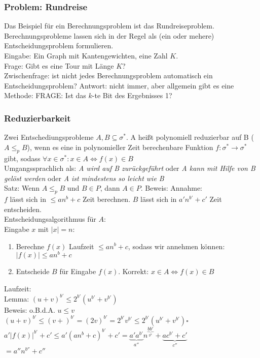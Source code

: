 \subsubsection{Problem: Rundreise}
Das Beispiel für ein Berechnungsproblem ist das Rundreiseproblem. Berechnungsprobleme lassen sich in der Regel als (ein oder mehere) Entscheidungsproblem formulieren.\\
Eingabe: Ein Graph mit Kantengewichten, eine Zahl $K$.\\
Frage: Gibt es eine Tour mit Länge $K$?\\
Zwischenfrage: ist nicht jedes Berechnungsproblem automatisch ein Entscheidungsproblem? Antwort: nicht immer, aber allgemein gibt es eine Methode:
FRAGE: Ist das $k$-te Bit des Ergebnisses 1?
\subsubsection{Reduzierbarkeit}
Zwei Entschediungsprobleme $A,B \subseteq \sigma^*$. A heißt polynomiell reduzierbar auf B ($A\leq_p B$), wenn es eine in polynomieller Zeit berechenbare Funktion $f: \sigma^* \rightarrow \sigma^*$ gibt, sodass $\forall x \in \sigma^*: x \in A \Leftrightarrow f(x) \in B$\\
Umgangssprachlich als: \emph{A wird auf B zurückgeführt} oder \emph{A kann mit Hilfe von B gelöst werden} oder \emph{A ist mindestens so leicht wie B}\\
Satz: Wenn $A \leq_p B$ und $B \in P$, dann $A \in P$.
Beweis: Annahme:\\
$f$ lässt sich in $\leq an^b+c$ Zeit berechnen. $B$ lässt sich in $a'n^{b'}+c'$ Zeit entscheiden.\\
Entscheidungsalgorithmus für $A$:\\
Eingabe $x$ mit $|x|=n$:
\begin{enumerate}
\item Berechne $f(x)$ Laufzeit $\leq an^b+c$, sodass wir annehmen können: $|f(x)| \leq an^b+c$
\item Entscheide $B$ für Eingabe $f(x)$. Korrekt: $x\in A \Leftrightarrow f(x) \in B$\\
\end{enumerate}
Laufzeit:\\
Lemma: $(u+v)^{b'} \leq 2^{b'}(u^{b'}+v^{b'})$\\
Beweis: o.B.d.A. $u \leq v$\\
$(u+v)^{b'} \leq (v+)^{b'} = (2v)^{b'} = 2^{b'} v^{b'} \leq 2^{b'} (u^{b'}+v^{b'}) \square$\\
$a'|f(x)|^{b'}+c' \leq a'(an^b+c)^{b'}+c' = \underbrace{a'a^{b'}}_{a''}n^{\underbrace{bb'}_{b^n}} + \underbrace{ac^{b'}+c'}_{c''}$\\
$=a''n^{b''}+c''$\\
